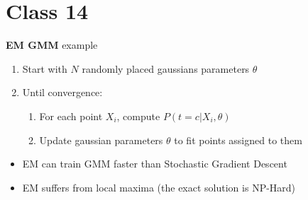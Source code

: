 \documentclass{article}
\begin{document}
\section{Class 14}
\textbf{EM GMM} example
\begin{enumerate}
    \item Start with $N$ randomly placed gaussians parameters $\theta$
    \item Until convergence: \begin{enumerate}
        \item For each point $X_i$, compute $P(t = c|X_i, \theta)$
        \item Update gaussian parameters $\theta$ to fit points assigned to them
    \end{enumerate}
\end{enumerate}

\begin{itemize}
    \item EM can train GMM faster than Stochastic Gradient Descent
    \item EM suffers from local maxima (the exact solution is NP-Hard)
\end{itemize}
\end{document}
